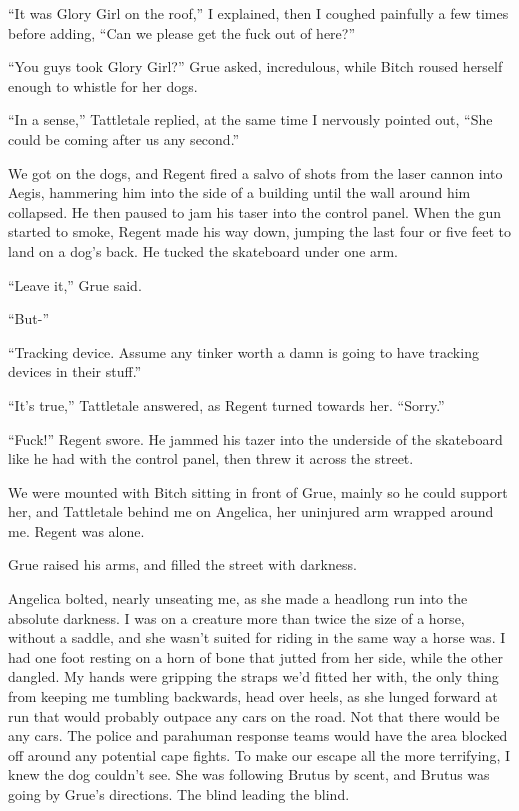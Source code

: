 ``It was Glory Girl on the roof,'' I explained, then I coughed painfully a few times before adding, ``Can we please get the fuck out of here?''



``You guys took Glory Girl?'' Grue asked, incredulous, while Bitch roused herself enough to whistle for her dogs.



``In a sense,'' Tattletale replied, at the same time I nervously pointed out, ``She could be coming after us any second.''



We got on the dogs, and Regent fired a salvo of shots from the laser cannon into Aegis, hammering him into the side of a building until the wall around him collapsed.  He then paused to jam his taser into the control panel.  When the gun started to smoke, Regent made his way down, jumping the last four or five feet to land on a dog's back.  He tucked the skateboard under one arm.



``Leave it,'' Grue said.



``But-''



``Tracking device.  Assume any tinker worth a damn is going to have tracking devices in their stuff.''



``It's true,'' Tattletale answered, as Regent turned towards her.  ``Sorry.''



``Fuck!'' Regent swore.  He jammed his tazer into the underside of the skateboard like he had with the control panel, then threw it across the street.



We were mounted with Bitch sitting in front of Grue, mainly so he could support her, and Tattletale behind me on Angelica, her uninjured arm wrapped around me.  Regent was alone.



Grue raised his arms, and filled the street with darkness.



Angelica bolted, nearly unseating me, as she made a headlong run into the absolute darkness.  I was on a creature more than twice the size of a horse, without a saddle, and she wasn't suited for riding in the same way a horse was.  I had one foot resting on a horn of bone that jutted from her side, while the other dangled.  My hands were gripping the straps we'd fitted her with, the only thing from keeping me tumbling backwards, head over heels, as she lunged forward at run that would probably outpace any cars on the road.  Not that there would be any cars.  The police and parahuman response teams would have the area blocked off around any potential cape fights.  To make our escape all the more terrifying, I knew the dog couldn't see.  She was following Brutus by scent, and Brutus was going by Grue's directions.  The blind leading the blind.



